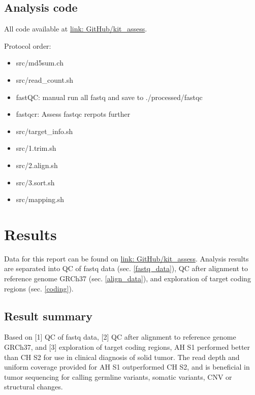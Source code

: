 \documentclass{article}
\begin{document}
\subsection{Analysis code}
All code available at \href{https://github.com/DylanLawless/kit_assess}{link: GitHub/kit\_assess}. 

Protocol order:
\begin{itemize}
\item src/md5sum.ch
\item src/read\_count.sh
\item fastQC: manual run all fastq and save to ./processed/fastqc
\item fastqcr: Assess fastqc rerpots further
\item src/target\_info.sh
\item src/1.trim.sh
\item src/2.align.sh
\item src/3.sort.sh
\item src/mapping.sh
\end{itemize}

\section{Results}
Data for this report can be found on \href{https://github.com/DylanLawless/kit_assess}{link: GitHub/kit\_assess}. 
Analysis results are separated into QC of fastq data (sec. \ref{fastq_data}), QC after alignment to reference genome GRCh37 (sec. \ref{align_data}), and exploration of target coding regions 
(sec. \ref{coding}).

\subsection{Result summary}
\label{result_summary}

Based on 
[1] QC of fastq data,
[2] QC after alignment to reference genome GRCh37, and 
[3] exploration of target coding regions,
AH S1 performed better than CH S2 for use in clinical diagnosis of solid tumor.
The read depth and uniform coverage provided for AH S1 outperformed CH S2, and is beneficial in tumor sequencing for calling germline variants, somatic variants, CNV or structural changes.
\end{document}

